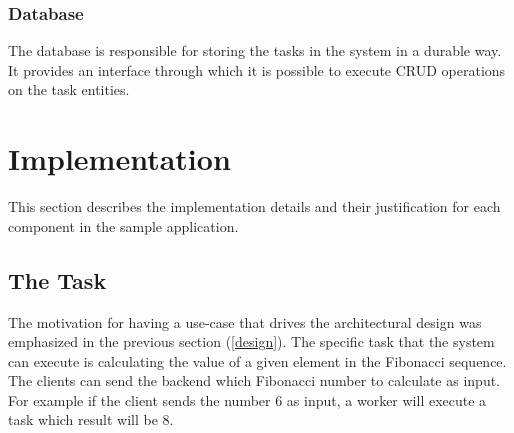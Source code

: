 \subsubsection{Database}


The database is responsible for storing the tasks in the system in a durable way. It provides an interface through which it is possible to execute CRUD operations on the task entities.

\section{Implementation} \label{sample-app-impl}

This section describes the implementation details and their justification for each component in the sample application.


\subsection{The Task}

The motivation for having a use-case that drives the architectural design was emphasized in the previous section (\ref{design}). The specific task that the system can execute is calculating the value of a given element in the Fibonacci sequence. The clients can send the backend which Fibonacci number to calculate as input. For example if the client sends the number 6 as input, a worker will execute a task which result will be 8.

